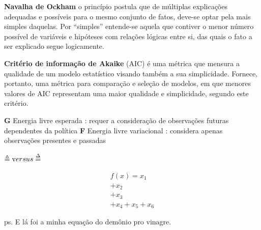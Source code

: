 \documentclass[
  12pt,
]{book}
\begin{document}
\textbf{Navalha de Ockham} o princípio postula que de múltiplas explicações adequadas e possíveis para o mesmo conjunto de fatos, deve-se optar pela mais simples daquelas. Por ``simples'' entende-se aquela que contiver o menor número possível de variáveis e hipóteses com relações lógicas entre si, das quais o fato a ser explicado segue logicamente.

\textbf{Critério de informação de Akaike} (AIC) é uma métrica que mensura a qualidade de um modelo estatístico visando também a sua simplicidade. Fornece, portanto, uma métrica para comparação e seleção de modelos, em que menores valores de AIC representam uma maior qualidade e simplicidade, segundo este critério.

\textbf{G} Energia livre esperada : requer a consideração de observações futuras dependentes da política
\textbf{F} Energia livre variacional : considera apenas observações presentes e passadas

\(\triangleq \text versus \overset{\Delta}{=}\)

\[ \begin{align} f(x) =  x_1  \\+ x_2 \\ + x_3 \\ + x_4 + x_5 + x_6\end{align}\]

ps. E lá foi a minha equação do demônio pro vinagre.

  
\end{document}
